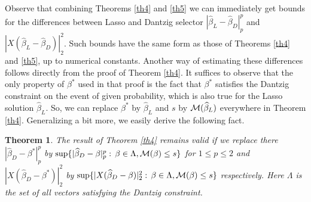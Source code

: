 \documentclass[dvips,aos]{imsart}
\numberwithin{equation}{section}
\theoremstyle{plain}
\newtheorem{thm}{Theorem}[section]%
\def\scm{{\cal M}}
\def\wh{\widehat}
\newcommand{\bb}{\mbox{\boldmath$\beta$}}
\def\bb{\beta}
\begin{document}
Observe that combining Theorems \ref{th4} and \ref{th5} we can
immediately get bounds for the differences between Lasso and Dantzig
selector $|\widehat\bb_L-\widehat\bb_D|_p^p$ and
$|X(\widehat\bb_L-\widehat\bb_D)|_2^2$. Such bounds have the same
form as those of Theorems \ref{th4} and \ref{th5}, up to numerical
constants. Another way of estimating these differences follows
directly from the proof of Theorem \ref{th4}. It suffices to observe
that the only property of $\bb^*$ used in that proof is the fact
that $\bb^*$ satisfies the Dantzig constraint on the event of given
probability, which is also true for the Lasso solution $\wh\bb_L$.
So, we can replace $\bb^*$ by $\wh\bb_L$ and $s$ by $\scm(\wh\bb_L)$
everywhere in Theorem \ref{th4}. Generalizing a bit more, we easily
derive the following fact.
%
\begin{thm}\label{th4a}
The result of Theorem \ref{th4} remains valid if we replace there
$|\widehat\bb_D-\bb^*|_p^p$ by $\sup\{|\widehat\bb_D-\bb|_p^p:\,
\bb\in\Lambda, \scm(\bb)\le s\}$ for $1\le p\le 2$ and
$|X(\widehat\bb_D-\bb^*)|_2^2$ by
$\sup\{|X(\widehat\bb_D-\bb)|_2^2:\, \bb\in\Lambda, \scm(\bb)\le
s\}$ respectively. Here $\Lambda$ is the set of all vectors
satisfying the Dantzig constraint.
\end{thm}





\end{document}
